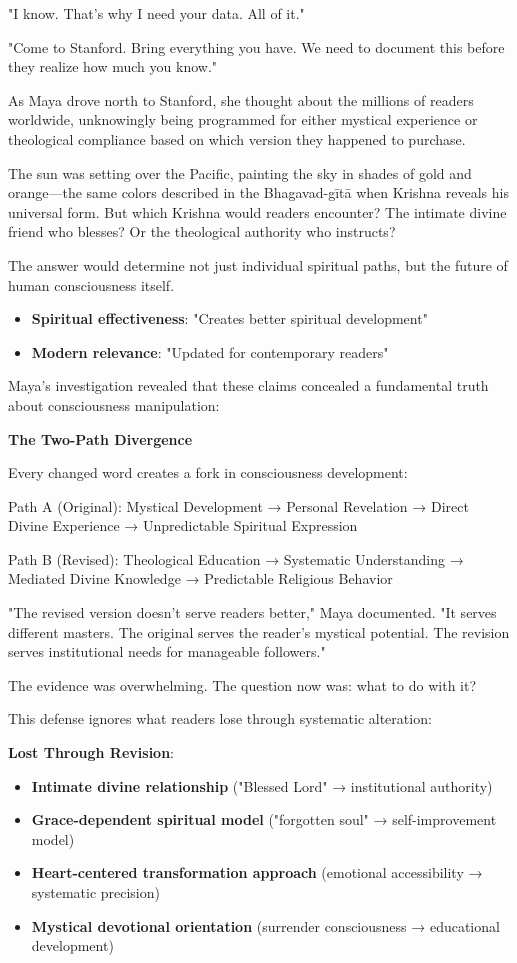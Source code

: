 \documentclass[12pt,twoside]{book}
\begin{document}
"I know. That's why I need your data. All of it."

"Come to Stanford. Bring everything you have. We need to document this before they realize how much you know."

As Maya drove north to Stanford, she thought about the millions of readers worldwide, unknowingly being programmed for either mystical experience or theological compliance based on which version they happened to purchase.

The sun was setting over the Pacific, painting the sky in shades of gold and orange—the same colors described in the Bhagavad-gītā when Krishna reveals his universal form. But which Krishna would readers encounter? The intimate divine friend who blesses? Or the theological authority who instructs?

The answer would determine not just individual spiritual paths, but the future of human consciousness itself.

\begin{itemize}
\item \textbf{\textbf{Spiritual effectiveness}}: "Creates better spiritual development"
\item \textbf{\textbf{Modern relevance}}: "Updated for contemporary readers"
\end{itemize}

Maya's investigation revealed that these claims concealed a fundamental truth about consciousness manipulation:

\textbf{\textbf{The Two-Path Divergence}}

Every changed word creates a fork in consciousness development:

Path A (Original): 
Mystical Development → Personal Revelation → Direct Divine Experience → Unpredictable Spiritual Expression

Path B (Revised):
Theological Education → Systematic Understanding → Mediated Divine Knowledge → Predictable Religious Behavior

"The revised version doesn't serve readers better," Maya documented. "It serves different masters. The original serves the reader's mystical potential. The revision serves institutional needs for manageable followers."

The evidence was overwhelming. The question now was: what to do with it?

This defense ignores what readers lose through systematic alteration:

\textbf{\textbf{Lost Through Revision}}:
\begin{itemize}
\item \textbf{\textbf{Intimate divine relationship}} ("Blessed Lord" → institutional authority)
\item \textbf{\textbf{Grace-dependent spiritual model}} ("forgotten soul" → self-improvement model)
\item \textbf{\textbf{Heart-centered transformation approach}} (emotional accessibility → systematic precision)
\item \textbf{\textbf{Mystical devotional orientation}} (surrender consciousness → educational development)
\end{itemize}
\end{document}
